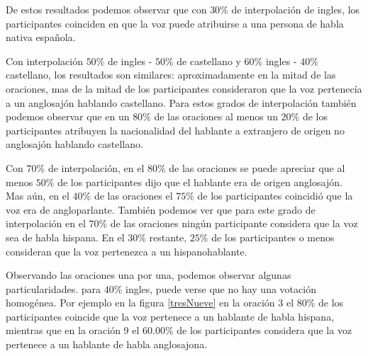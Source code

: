 De estos resultados podemos observar que con $30\%$ de interpolación de ingles, los participantes coinciden en que la voz puede atribuirse a una persona de habla nativa española.

Con interpolación $50\%$ de ingles - $50\%$ de castellano y $60\%$ ingles - $40\%$ castellano, los resultados son similares: aproximadamente en la mitad de las oraciones, mas de la mitad de los participantes consideraron que la voz pertenecía a un anglosajón hablando castellano. Para estos grados de interpolación también podemos observar que en un $80\%$ de las oraciones al menos un $20\%$ de los participantes atribuyen la nacionalidad del hablante a extranjero de origen no anglosajón hablando castellano.

Con $70\%$ de interpolación, en el $80\%$ de las oraciones se puede apreciar que al menos $50\%$ de los participantes dijo que el hablante era de origen anglosajón. Mas aún, en el $40\%$ de las oraciones el $75\%$ de los participantes coincidió que la voz era de angloparlante. También podemos ver que para este grado de interpolación en el $70\%$ de las oraciones ningún participante considera que la voz sea de habla hispana. En el $30\%$ restante, $25\%$ de los participantes o menos consideran que la voz pertenezca a un hispanohablante.



Observando las oraciones una por una, podemos observar algunas particularidades. para $40\%$ ingles, puede verse que no hay una votación homogénea. Por ejemplo en la figura \ref{tresNueve} en la oración $3$ el $80\%$ de los participantes coincide que la voz pertenece a un hablante de habla hispana, mientras que en la oración $9$ el $60.00\%$ de los participantes considera que la voz pertenece a un hablante de habla anglosajona.

